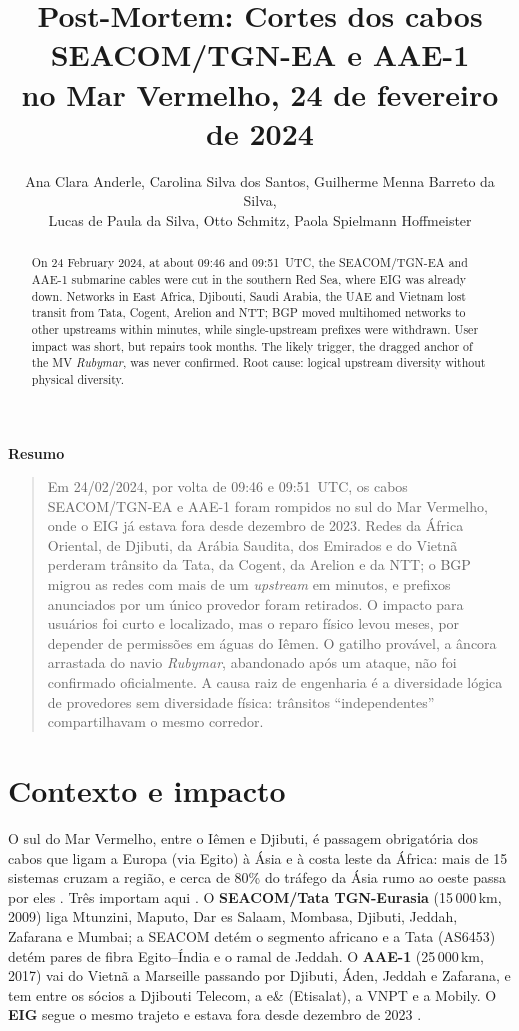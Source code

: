 \documentclass[12pt]{article}
\title{Post-Mortem: Cortes dos cabos SEACOM/TGN-EA e AAE-1\\no Mar Vermelho, 24 de fevereiro de 2024}
\author{Ana Clara Anderle\inst{1}, Carolina Silva dos Santos\inst{1},
  Guilherme Menna Barreto da Silva\inst{1},\\ Lucas de Paula da Silva\inst{1},
  Otto Schmitz\inst{1}, Paola Spielmann Hoffmeister\inst{1}}
\makeatletter
\newenvironment{resumo}{\begin{center}\bfseries Resumo\end{center}\begin{quotation}}{\end{quotation}}
\renewcommand{\maketitle}{\begin{center}{\Large\bfseries\@title\par}\vspace{1em}{\@author\par}\vspace{.5em}{\small\sbcaddress\par}\end{center}}
\makeatother
\begin{document}
\maketitle

\begin{abstract}
  On 24 February 2024, at about 09:46 and 09:51~UTC, the SEACOM/TGN-EA and AAE-1
  submarine cables were cut in the southern Red Sea, where EIG was already down.
  Networks in East Africa, Djibouti, Saudi Arabia, the UAE and Vietnam lost transit
  from Tata, Cogent, Arelion and NTT; BGP moved multihomed networks to other upstreams
  within minutes, while single-upstream prefixes were withdrawn. User impact was short,
  but repairs took months. The likely trigger, the dragged anchor of the MV
  \textit{Rubymar}, was never confirmed. Root cause: logical upstream diversity without
  physical diversity.
\end{abstract}

\begin{resumo}
  Em 24/02/2024, por volta de 09:46 e 09:51~UTC, os cabos SEACOM/TGN-EA e AAE-1 foram
  rompidos no sul do Mar Vermelho, onde o EIG já estava fora desde dezembro de 2023.
  Redes da África Oriental, de Djibuti, da Arábia Saudita, dos Emirados e do Vietnã
  perderam trânsito da Tata, da Cogent, da Arelion e da NTT; o BGP migrou as redes com
  mais de um \textit{upstream} em minutos, e prefixos anunciados por um único provedor
  foram retirados. O impacto para usuários foi curto e localizado, mas o reparo físico
  levou meses, por depender de permissões em águas do Iêmen. O gatilho provável, a âncora
  arrastada do navio \textit{Rubymar}, abandonado após um ataque, não foi confirmado
  oficialmente. A causa raiz de engenharia é a diversidade lógica de provedores sem
  diversidade física: trânsitos ``independentes'' compartilhavam o mesmo corredor.
\end{resumo}

\section{Contexto e impacto}

O sul do Mar Vermelho, entre o Iêmen e Djibuti, é passagem obrigatória dos cabos que
ligam a Europa (via Egito) à Ásia e à costa leste da África: mais de 15 sistemas cruzam a
região, e cerca de 80\% do tráfego da Ásia rumo ao oeste passa por eles \cite{hgc2024b}.
Três importam aqui \cite{telegeography2026}. O \textbf{SEACOM/Tata TGN-Eurasia}
(15\,000\,km, 2009) liga Mtunzini, Maputo, Dar es Salaam, Mombasa, Djibuti, Jeddah,
Zafarana e Mumbai; a SEACOM detém o segmento africano e a Tata (AS6453) detém pares de
fibra Egito--Índia e o ramal de Jeddah. O \textbf{AAE-1} (25\,000\,km, 2017) vai do Vietnã
a Marseille passando por Djibuti, Áden, Jeddah e Zafarana, e tem entre os sócios a
Djibouti Telecom, a e\& (Etisalat), a VNPT e a Mobily. O \textbf{EIG} segue o mesmo trajeto
e estava fora desde dezembro de 2023 \cite{madory2024}.
\end{document}
